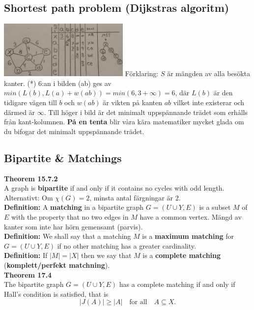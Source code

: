 \documentclass{article}
\begin{document}
\begin{multicols}{2}
\subsection{Shortest path problem (Dijkstras algoritm)}
\includegraphics[width=0.48\textwidth]{kortast}
Förklaring: $S$ är mängden av alla besökta kanter. (*) 6:an i bilden (ab) ges av $min(L(b),L(a)+w(ab))=min(6,3+\infty)=6$, där $L(b)$ är den tidigare vägen till $b$ och $w(ab)$ är vikten på kanten $ab$ vilket inte existerar och därmed är $\infty$. Till höger i bild är det minimalt uppspännande trädet som erhålls från kant-kolumnen. \textbf{På en tenta} blir våra kära matematiker mycket glada om du bifogar det minimalt uppspännande trädet.
    \subsection{Bipartite \& Matchings}
    
    
    \textbf{Theorem 15.7.2}\\
    A graph is \textbf{bipartite} if and only if it contains no cycles with odd length. Alternativt: Om $\chi(G) = 2$, minsta antal färgningar är 2.\\
    \newline
    \textbf{Definition:} A \textbf{matching} in a bipartite graph $G = (U \cup Y, E)$ is a subset $M$ of $E$ with the property that no two edges in $M$ have a common vertex. Mängd av kanter som inte har hörn gemensamt (parvis).\\
    \newline
    \textbf{Definition:} We shall say that a matching $M$ is a \textbf{maximum matching} for $G = (U \cup Y, E)$ if no other matching has a greater cardinality.\\
    \newline
    \textbf{Definition:} If $|M|=|X|$ then we say that $M$ is a \textbf{complete matching} (\textbf{komplett/perfekt matchning}). \\
    \newline
    \textbf{Theorem 17.4}\\
    The bipartite graph $G = (U \cup Y, E)$ has a complete matching if and only if Hall's condition is satisfied, that is 
    $$|J(A)| \geq |A| \quad \text{for all} \quad A \subseteq X.$$ 
\end{multicols}
\end{document}

